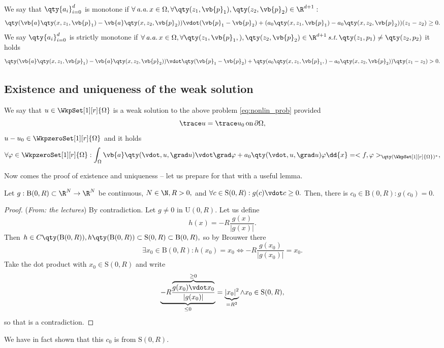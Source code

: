 \begin{definition}[Monotonicity]
	We say that $\qty{a_i}_{i=0}^d$ is monotone if $\forall \, \text{\textit{a.a.}} \, x \in \Omega, \forall \qty(z_1, \vb{p}_1), \qty(z_2, \vb{p}_2) \in \R^{d+1}:$
	\[
		\qty(\vb{a}\qty(x,z_1,\vb{p}_1)-\vb{a}\qty(x,z_2,\vb{p}_2))\vdot (\vb{p}_1 - \vb{p}_2) + (a_0\qty(x,z_1,\vb{p}_1)-a_0\qty(x,z_2,\vb{p}_2))(z_1 - z_2) \geq 0.
	\]
	We say $\qty{a_i}_{i=0}^d$ is strictly monotone if $\forall \, \text{\textit{a.a.}} \,x \in \Omega, \forall \qty(z_1, \vb{p}_1,), \qty(z_2, \vb{p}_2) \in \R^{d+1} \, \text{\textit{s.t.}} \, \qty(z_1,p_1) \neq \qty(z_2, p_2)$ it holds 
	\[
		\qty(\vb{a}\qty(x,z_1, \vb{p}_1) - \vb{a}\qty(x, z_2, \vb{p}_2)) \vdot \qty(\vb{p}_1 - \vb{p}_2) + \qty(a_0\qty(x,z_1, \vb{p}_1,)-a_0\qty(x,z_2, \vb{p}_2))\qty(z_1 - z_2) > 0.
	\]
\end{definition}

\subsection{Existence and uniqueness of the weak solution}
\label{sec:exis_uniq}

\begin{definition}
	We say that $u \in \WkpSet[1][r]{\Omega}$ is a weak solution to the above problem \ref{eq:nonlin_prob} provided
	\[
		\trace u = \trace u_0 \, \text{on} \, \partial \Omega,
	\]
	$u - u_0 \in \WkpzeroSet[1][r]{\Omega}$ and it holds
	\[
		\forall \varphi \in \WkpzeroSet[1][r]{\Omega}: \int_{\Omega}\vb{a}\qty(\vdot, u, \grad u)\vdot \grad \varphi +a_0\qty(\vdot, u, \grad u) \varphi \dd{x} = <f,\varphi>_{\qty(\WkpSet[1][r]{\Omega})^{*}}, 
	\]
\end{definition}

Now comes the proof of existence and uniqueness -- let us prepare for that with a useful lemma.

\begin{lemma}
	Let $g: \text{B}(0,R) \subset \R^N \to \R^N$ be continuous, $N \in \N, R>0,$ and $\forall c \in \text{S}(0,R): g(c) \vdot c \geq 0.$ Then, there is $c_0 \in \text{B}(0,R): g(c_0) = 0.$
	\begin{proof}(\textit{From: the lectures})
		By contradiction. Let $g \neq 0$ in $\text{U}(0,R)$. Let us define
		\[
			h(x) = -R\frac{g(x)}{|g(x)|}.
		\]
		Then $h \in C\qty(\text{B}(0,R)), h\qty(\text{B}(0,R)) \subset \text{S}(0,R)\subset \text{B}(0,R),$ so by Brouwer there
		\[
			\exists x_0 \in \text{B}(0,R): h(x_0) = x_0 \Leftrightarrow -R \frac{g(x_0)}{|g(x_0)|} = x_0.
		\]
		Take the dot product with $x_0 \in \text{S}(0,R)$ and write
		\[
			\underbrace{-R \frac{\overbrace{g(x_0) \vdot x_0}^{\geq 0}}{|g(x_0)|}}_{\leq 0} = \underbrace{|x_0|^{2}}_{ = R^{2}} \wedge x_0 \in \text{S}(0,R),
		\]
		so that is a contradiction.
	\end{proof}
\end{lemma}
\begin{remark}
    We have in fact shown that this $c_0$ is from $\text{S}(0,R).$
\end{remark}


